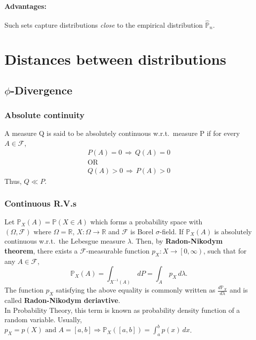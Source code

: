\documentclass[11pt]{report}
\begin{document}
\paragraph{Advantages:}
Such sets capture distributions \textit{close} to the empirical distribution $\hat{\mathbb{P}}_n$.

\section{Distances between distributions}
\subsection{$\phi$-Divergence}
\subsubsection*{Absolute continuity}
A measure Q is said to be absolutely continuous w.r.t.\ measure P if for every $A \in \mathcal{F}$,
\begin{align*}
    P(A) = 0 \, \Rightarrow \, Q(A) = 0\\
    \text{OR}\\
    Q(A) > 0 \, \Rightarrow \, P(A) > 0
\end{align*}
Thus, $Q \ll P$.

\subsubsection*{Continuous R.V.s}
Let $\mathbb{P}_X (A) = \mathbb{P}(X \in A)$ which forms a probability space with $(\Omega, \mathcal{F}) \text{ where } \Omega = \mathbb{R}$, $X:\Omega \to \mathbb{R}$ and $\mathcal{F}$ is Borel $\sigma$-field.  
If $\mathbb{P}_X(A)$ is absolutely continuous w.r.t.\ the Lebesgue measure $\lambda$.
Then, by \textbf{Radon-Nikodym theorem}, there exists a $\mathcal{F}$-measurable function $p_X : X \to \left[0, \infty \right)$, such that for any $A \in \mathcal{F}$,
\[
    \mathbb{P}_X(A) = \int_{X^{-1}(A)} \, dP = \int_{A} \, p_X \, d\lambda.
\]
The function $p_X$ satisfying the above equality is commonly written as $\frac{d\mathbb{P}_X}{d\lambda}$ and is called \textbf{Radon-Nikodym deriavtive}.\\
In Probability Theory, this term is known as probability density function of a random variable.
Usually, $p_X = p(X) \text{ and } A = \left[a, b\right] \Rightarrow \mathbb{P}_X(\left[a, b\right]) = \int_{a}^{b} p(x) \, dx$.
\end{document}
